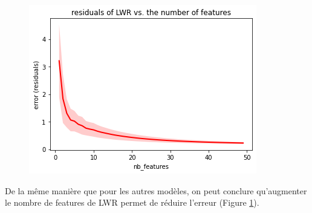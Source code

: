 \documentclass[french,12pt]{article}
\begin{document}
\begin{figure}[h]
	\centering
	\includegraphics[width=.45\textwidth]{LWR_error_vs_n_features.png}
	\label{fig:LWR_error_vs_n_features}
\end{figure}

De la même manière que pour les autres modèles, on peut conclure qu'augmenter le nombre de features de LWR permet de réduire l'erreur (Figure \ref{fig:LWR_error_vs_n_features}).
\end{document}
